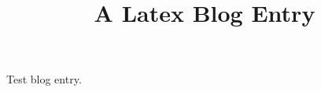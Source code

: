 \documentclass{wpblogentry}
\title{A Latex Blog Entry}
\begin{document}
      Test blog entry.
\end{document}
